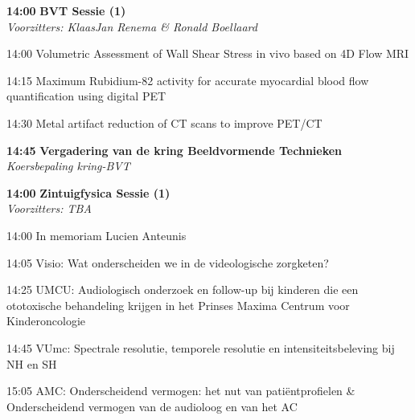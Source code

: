 \documentclass[a4paper,10pt]{report}
\begin{document}
\begin{multicols*}{3}
\begin{packed_enum}
\item[\textbf{14:00}]\textbf{BVT Sessie (1)}\\\textit{Voorzitters: KlaasJan Renema \& Ronald Boellaard}
\item[14:00] Volumetric Assessment of Wall Shear Stress in vivo based on 4D Flow MRI 
\item[14:15] Maximum Rubidium-82 activity for accurate myocardial blood flow quantification using digital PET 
\item[14:30] Metal artifact reduction of CT scans to improve PET/CT 
\item[\textbf{14:45}] \textbf{Vergadering van de kring Beeldvormende Technieken} \\ \textit{Koersbepaling kring-BVT}
\end{packed_enum} %
 
\vfill

\begin{packed_enum}
\item[\textbf{14:00}] \textbf{Zintuigfysica Sessie (1)}\\\textit{Voorzitters: TBA}
\item[14:00] In memoriam Lucien Anteunis 
\item[14:05] Visio: Wat onderscheiden we in de videologische zorg\-keten? 
\item[14:25] UMCU: Audiologisch onderzoek en follow-up bij kinderen die een ototoxische behandeling krijgen in het Prinses Maxima Centrum voor Kinderoncologie  
\item[14:45] VUmc: Spectrale resolutie, temporele resolutie en intensiteitsbeleving bij NH en SH 
\item[15:05] AMC: Onderscheidend vermogen: het nut van patiëntprofielen \&
Onderscheidend vermogen van de audioloog en van het AC
\end{packed_enum} %


\end{multicols*}
\end{document}
